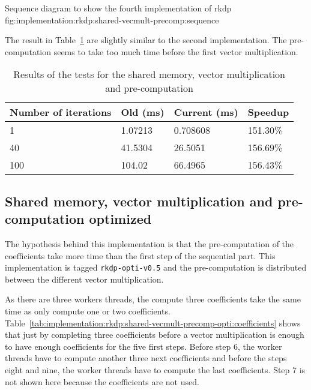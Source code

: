 {Sequence diagram to show the fourth implementation of \acrshort{rkdp}}
{fig:implementation:rkdp:shared-vecmult-precomp:sequence}

The result in Table~\ref{tab:implementation:rkdp:shared-vecmult-pre-computed:results}
are slightly similar to the second implementation.
The pre-computation seems to take too much time before the first vector
multiplication.

\begin{table}[ht]
    \centering
    \begin{tabular}{|l|l|l|l|}
        \hline
        \textbf{Number of iterations} & \textbf{Old (ms)} & \textbf{Current (ms)} & \textbf{Speedup} \\
        \hline
        1 & 1.07213 & 0.708608 & 151.30\% \\
        \hline
        40 & 41.5304 & 26.5051 & 156.69\% \\
        \hline
        100 & 104.02 & 66.4965 & 156.43\% \\
        \hline
    \end{tabular}
    \caption{Results of the tests for the shared memory, vector multiplication and pre-computation}
    \label{tab:implementation:rkdp:shared-vecmult-pre-computed:results}
\end{table}


\subsection{Shared memory, vector multiplication and pre-computation optimized}
\label{ch:implementation:rkdp:shared-vecmult-precomp-opti}

The hypothesis behind this implementation is that the pre-computation of the
coefficients take more time than the first step of the sequential part.
This implementation is tagged \texttt{rkdp-opti-v0.5} and the pre-computation is
distributed between the different vector multiplication.

As there are three workers threads, the compute three coefficients take the same
time as only compute one or two coefficients.
Table~\ref{tab:implementation:rkdp:shared-vecmult-precomp-opti:coefficients}
shows that just by completing three coefficients before a vector multiplication
is enough to have enough coefficients for the five first steps.
Before step 6, the worker threads have to compute another three next
coefficients and before the steps eight and nine, the worker threads have to
compute the last coefficients.
Step 7 is not shown here because the coefficients are not used.


